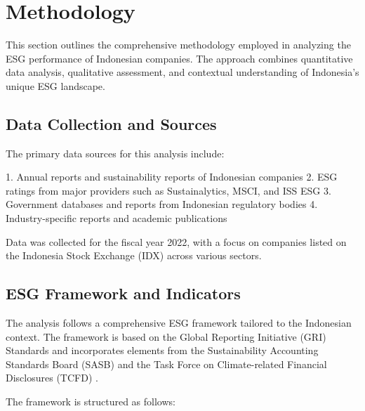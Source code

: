 \section{Methodology}

This section outlines the comprehensive methodology employed in analyzing the ESG performance of Indonesian companies. The approach combines quantitative data analysis, qualitative assessment, and contextual understanding of Indonesia's unique ESG landscape.

\subsection{Data Collection and Sources}

The primary data sources for this analysis include:

1. Annual reports and sustainability reports of Indonesian companies
2. ESG ratings from major providers such as Sustainalytics, MSCI, and ISS ESG
3. Government databases and reports from Indonesian regulatory bodies
4. Industry-specific reports and academic publications

Data was collected for the fiscal year 2022, with a focus on companies listed on the Indonesia Stock Exchange (IDX) across various sectors.

\subsection{ESG Framework and Indicators}

The analysis follows a comprehensive ESG framework tailored to the Indonesian context. The framework is based on the Global Reporting Initiative (GRI) Standards \cite{GRI2021} and incorporates elements from the Sustainability Accounting Standards Board (SASB) \cite{SASB2022} and the Task Force on Climate-related Financial Disclosures (TCFD) \cite{TCFD2021}.

The framework is structured as follows:

